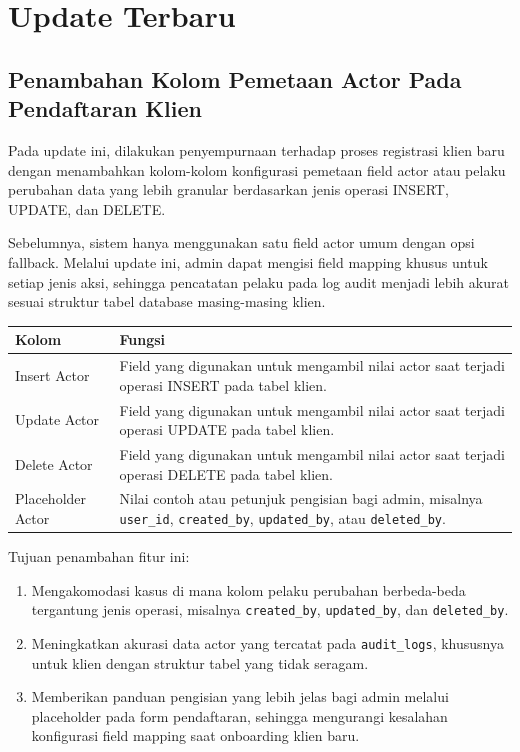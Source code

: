 \chapter{Update Terbaru}

\section{Penambahan Kolom Pemetaan Actor Pada Pendaftaran Klien}

Pada update ini, dilakukan penyempurnaan terhadap proses registrasi klien baru dengan menambahkan kolom-kolom konfigurasi pemetaan field actor atau pelaku perubahan data yang lebih granular berdasarkan jenis operasi INSERT, UPDATE, dan DELETE.

Sebelumnya, sistem hanya menggunakan satu field actor umum dengan opsi fallback. Melalui update ini, admin dapat mengisi field mapping khusus untuk setiap jenis aksi, sehingga pencatatan pelaku pada log audit menjadi lebih akurat sesuai struktur tabel database masing-masing klien.

\begin{longtable}{p{4cm}p{9cm}}
\toprule
\textbf{Kolom} & \textbf{Fungsi} \\
\midrule
Insert Actor & Field yang digunakan untuk mengambil nilai actor saat terjadi operasi INSERT pada tabel klien. \\
\midrule
Update Actor & Field yang digunakan untuk mengambil nilai actor saat terjadi operasi UPDATE pada tabel klien. \\
\midrule
Delete Actor & Field yang digunakan untuk mengambil nilai actor saat terjadi operasi DELETE pada tabel klien. \\
\midrule
Placeholder Actor & Nilai contoh atau petunjuk pengisian bagi admin, misalnya \texttt{user\_id}, \texttt{created\_by}, \texttt{updated\_by}, atau \texttt{deleted\_by}. \\
\bottomrule
\end{longtable}

Tujuan penambahan fitur ini:

\begin{enumerate}
    \item Mengakomodasi kasus di mana kolom pelaku perubahan berbeda-beda tergantung jenis operasi, misalnya \texttt{created\_by}, \texttt{updated\_by}, dan \texttt{deleted\_by}.
    \item Meningkatkan akurasi data actor yang tercatat pada \texttt{audit\_logs}, khususnya untuk klien dengan struktur tabel yang tidak seragam.
    \item Memberikan panduan pengisian yang lebih jelas bagi admin melalui placeholder pada form pendaftaran, sehingga mengurangi kesalahan konfigurasi field mapping saat onboarding klien baru.
\end{enumerate}

